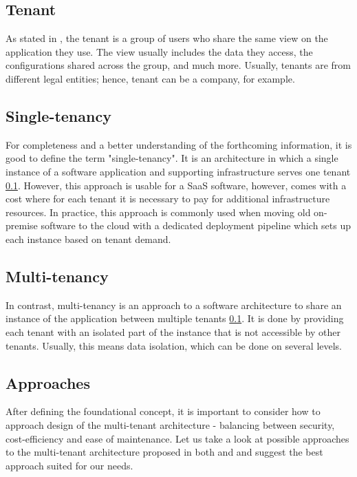 \subsection{Tenant}
\label{subsec:tenant}
As stated in \cite{MultitennancyArchitecture2012}, the tenant is a group of users who share the same view on the application they use.
The view usually includes the data they access, the configurations shared across the group, and much more.
Usually, tenants are from different legal entities; hence, tenant can be a company, for example.

\subsection{Single-tenancy}
For completeness and a better understanding of the forthcoming information, it is good to define the term "single-tenancy".
It is an architecture in which a single instance of a software application and supporting infrastructure serves one tenant \ref{subsec:tenant}.
However, this approach is usable for a \ac{SaaS} software, however, comes with a cost where for each tenant it is necessary to pay for additional infrastructure resources.
In practice, this approach is commonly used when moving old on-premise software to the cloud with a dedicated deployment pipeline which sets up each instance based on tenant demand. 


\subsection{Multi-tenancy}
In contrast, multi-tenancy is an approach to a software architecture to share an instance of the application between multiple tenants \ref{subsec:tenant}.
It is done by providing each tenant with an isolated part of the instance that is not accessible by other tenants.
Usually, this means data isolation, which can be done on several levels.

\subsection{Approaches}
After defining the foundational concept, it is important to consider how to approach design of the multi-tenant architecture - balancing between security, cost-efficiency and ease of maintenance.
Let us take a look at possible approaches to the multi-tenant architecture proposed in both \cite{MultitennancyArchitecture2012} and \cite{MultitenancyArchitectureMedium} and suggest the best approach suited for our needs.

